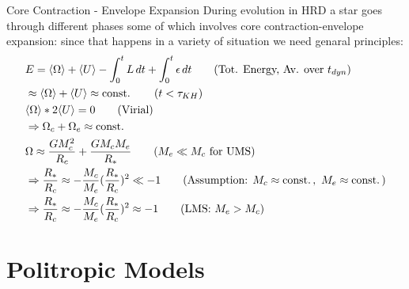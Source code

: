 \begin{frame}{Core Contraction - Envelope Expansion}
    During evolution in HRD a star goes through different phases some of which involves core contraction-envelope expansion: since that happens in a variety of situation we need genaral principles:
    \begin{align*}
        &E=\exv{\Omega}+\exv{U}-\int_0^tL\,dt+\int_0^t\epsilon\,dt\tag{Tot. Energy, Av. over $t_{dyn}$}\\
        &\approx\exv{\Omega}+\exv{U}\approx\const{}\tag{$t<\tkh{}$}\\
        &\exv{\Omega}*2\exv{U}=0\tag{Virial}\\
        &\Rightarrow\Omega_c+\Omega_e\approx\const{}\\
        &\Omega\approx \frac{GM_c^2}{R_c}+\frac{GM_cM_e}{R_*}\tag{$M_e\ll M_c$ for UMS}\\
        &\Rightarrow \frac{R_*}{R_c}\approx-\frac{M_c}{M_e}(\frac{R_*}{R_c})^2\ll-1\tag{Assumption: $M_c\approx\const{},\ M_e\approx\const{}$}\\
        &\Rightarrow \frac{R_*}{R_c}\approx-\frac{M_c}{M_e}(\frac{R_*}{R_c})^2\approx-1\tag{LMS: $M_e>M_c$}
    \end{align*}
\end{frame}

\section{Politropic Models}

